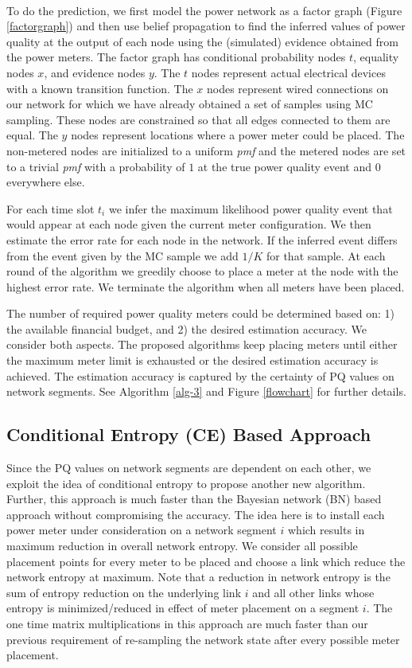 \noindent \\
To do the prediction, we first model the power network as a factor graph (Figure \ref{factorgraph}) and then use belief propagation to find the inferred values of power quality at the output of each node using the (simulated) evidence obtained from the power meters. The factor graph has conditional probability nodes $t$, equality nodes $x$, and evidence nodes $y$. The $t$ nodes represent actual electrical devices with a known transition function. The $x$ nodes represent wired connections on our network for which we have already obtained a set of samples using MC sampling. These nodes are constrained so that all edges connected to them are equal. The $y$ nodes represent locations where a power meter could be placed. The non-metered nodes are initialized to a uniform \emph{pmf} and the metered nodes are set to a trivial \emph{pmf} with a probability of $1$ at the true power quality event and $0$ everywhere else. 

For each time slot $t_{i}$ we infer the maximum likelihood power
quality event that would appear at each node given the current meter
configuration. We then estimate the error rate for each node in the
network. If the inferred event differs from the event given by the
MC sample we add $1/K$ for that sample. At each round of the algorithm
we greedily choose to place a meter at the node with the highest error
rate. We terminate the algorithm when all meters have been placed.

The number of required power quality meters could be determined based on: 1) the available financial budget, and 2) the desired estimation accuracy. We consider both aspects. The proposed algorithms keep placing meters until either the maximum meter limit is exhausted or the desired estimation accuracy is achieved. The estimation accuracy is captured by the certainty of PQ values on network segments. See Algorithm \ref{alg-3} and Figure \ref{flowchart} for further details.

\subsection{Conditional Entropy (CE) Based Approach}
Since the PQ values on network segments are dependent on each other, we exploit the idea of conditional entropy to propose another new algorithm. Further, this approach is much faster than the Bayesian network (BN) based approach without compromising the accuracy. The idea here is to install each power meter under consideration on a network segment $i$ which results in maximum reduction in overall network entropy. We consider all possible placement points for every meter to be placed and choose a link which reduce the network entropy at maximum. Note that a reduction in network entropy is the sum of entropy reduction on the underlying link $i$ and all other links whose entropy is minimized/reduced in effect of meter placement on a segment $i$. The one time matrix multiplications in this approach are much faster than our previous requirement of re-sampling the network state after every possible meter placement.

